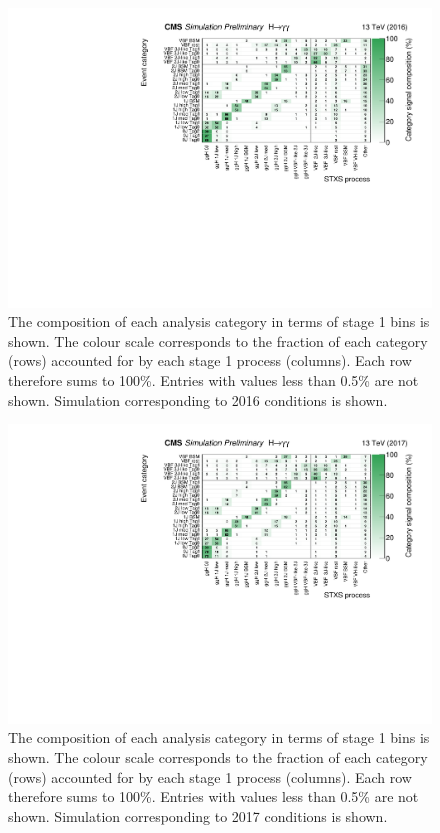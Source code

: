 \begin{figure}[hptb]
\centering
\includegraphics[width=\textwidth]{Figures/Results/Cats2016.pdf}
\caption{
  The composition of each analysis category in terms of stage 1 bins is shown. 
  The colour scale corresponds to the fraction of each category (rows) 
  accounted for by each stage 1 process (columns). 
  Each row therefore sums to 100\%. 
  Entries with values less than 0.5\% are not shown. 
  Simulation corresponding to 2016 conditions is shown.
}
\label{fig:results_Cats2016}
\end{figure}

\begin{figure}[hptb]
\centering
\includegraphics[width=\textwidth]{Figures/Results/Cats2017.pdf}
\caption{
  The composition of each analysis category in terms of stage 1 bins is shown. 
  The colour scale corresponds to the fraction of each category (rows) 
  accounted for by each stage 1 process (columns). 
  Each row therefore sums to 100\%. 
  Entries with values less than 0.5\% are not shown. 
  Simulation corresponding to 2017 conditions is shown.
}
\label{fig:results_Cats2017}
\end{figure}

